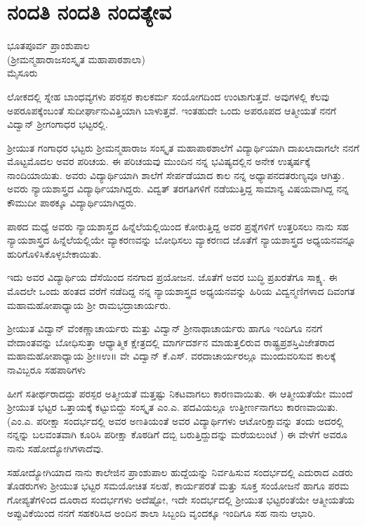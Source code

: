 {\fontsize{14}{16}\selectfont
\chapter{ನಂದತಿ ನಂದತಿ ನಂದತ್ಯೇವ}                           

\begin{center}
\smallskip

ಭೂತಪೂರ್ವ ಪ್ರಾಂಶುಪಾಲ\\
(ಶ್ರೀಮನ್ಮಹಾರಾಜಸಂಸ್ಕೃತ  ಮಹಾಪಾಠಶಾಲಾ)\\
ಮೈಸೂರು
\addrule
\end{center}
ಲೋಕದಲ್ಲಿ ಸ್ನೇಹ ಬಾಂಧವ್ಯಗಳು ಪರಸ್ಪರ ಕಾಲಕರ್ಮ ಸಂಯೋಗದಿಂದ ಉಂಟಾಗುತ್ತವೆ. ಅವುಗಳಲ್ಲಿ ಕೆಲವು ಅಪರೂಪಕ್ಕೆಂಬಂತೆ ಸುದೀರ್ಘಾನುವಿತ್ತಿಯಾಗಿ ಬಾಳುತ್ತವೆ. ಇಂತಹುದೇ ಒಂದು ಅಪರೂಪದ ಆತ್ಮೀಯತೆ ನನಗೆ ವಿದ್ವಾನ್ ಶ್ರೀಗಂಗಾಧರ ಭಟ್ಟರಲ್ಲಿ. 

ಶ್ರೀಯುತ ಗಂಗಾಧರ ಭಟ್ಟರು ಶ್ರೀಮನ್ಮಹಾರಾಜ ಸಂಸ್ಕೃತ ಮಹಾಪಾಠ\-ಶಾಲೆಗೆ ವಿದ್ಯಾರ್ಥಿಯಾಗಿ ದಾಖಲಾದಾಗಲೇ ನನಗೆ ಮೊಟ್ಟಮೊದಲ ಅವರ ಪರಿಚಯ. ಈ ಪರಿಚಯವು ಮುಂದಿನ ನನ್ನ ಭವಿಷ್ಯದಲ್ಲಿನ ಅನೇಕ ಉತ್ಕರ್ಷಕ್ಕೆ ನಾಂದಿಯಾಯಿತು.  ಅವರು ವಿದ್ಯಾರ್ಥಿಯಾಗಿ ಶಾಲೆಗೆ ಸೇರ್ಪಡೆಯಾದ ಕಾಲ ನನ್ನ ಅಧ್ಯಾಪನದ\break ತರುಣ್ಯವೂ ಆಗಿತ್ತು. ಅವರು ನ್ಯಾಯಶಾಸ್ತ್ರದ ವಿದ್ಯಾರ್ಥಿಯಾಗಿದ್ದರು. ವಿದ್ವತ್ ತರಗತಿಗಳಿಗೆ ನಡೆಯುತ್ತಿದ್ದ ಸಾಮಾನ್ಯ ವಿಷಯವಾಗಿದ್ದ ನನ್ನ ಕೌಮುದೀ ಪಾಠಕ್ಕೂ ವಿದ್ಯಾರ್ಥಿಯಾಗಿದ್ದರು.

ಪಾಠದ ಮಧ್ಯೆ ಅವರು ನ್ಯಾಯಶಾಸ್ತ್ರದ ಹಿನ್ನೆಲೆಯಲ್ಲಿಯಿಂದ ಕೋರುತ್ತಿದ್ದ ಅವರ ಪ್ರಶ್ನೆಗಳಿಗೆ ಉತ್ತರಿಸಲು ನಾನು ಸಹ ನ್ಯಾಯಶಾಸ್ತ್ರದ ಹಿನ್ನೆಲೆಯಲ್ಲಿಯೇ ವ್ಯಾಕರಣವನ್ನು ಬೋಧಿಸಲು ವ್ಯಾಕರಣದ ಜೊತೆಗೆ ನ್ಯಾಯಶಾಸ್ತ್ರದ ಅಧ್ಯಯನವನ್ನೂ ಹುರಿ\-ಗೊಳಿಸಿಕೊಳ್ಳಬೇಕಾಯಿತು. 

ಇದು ಅವರ ವಿದ್ಯಾರ್ಥಿಯ ದೆಸೆಯಿಂದ ನನಗಾದ ಪ್ರಯೋಜನ. ಜೊತೆಗೆ ಅವರ ಬುದ್ಧಿ ಪ್ರಖರತೆಗೂ ಸಾಕ್ಷ್ಯ. ಈ ಮೊದಲೇ ಒಂದು ಹಂತದ ವರೆಗೆ ನಡೆದಿದ್ದ ನನ್ನ ನ್ಯಾಯಶಾಸ್ತ್ರದ ಅಧ್ಯಯನವನ್ನು ಹಿರಿಯ ವಿದ್ವನ್ಮಣಿಗಳಾದ ದಿವಂಗತ ಮಹಾಮಹೋಪಾಧ್ಯಾಯ ಶ್ರೀ ರಾಮಭದ್ರಾಚಾರ್ಯರು.

ಶ್ರೀಯುತ ವಿದ್ವಾನ್ ವೆಂಕಣ್ಣಾಚಾರ್ಯರು ಮತ್ತು ವಿದ್ವಾನ್ ಶ್ರೀನಾಥಾ\-\break ಚಾರ್ಯರು ಹಾಗೂ ಇಂದಿಗೂ ನನಗೆ ವೇದಾಂತವನ್ನು ಬೋಧಿಸುತ್ತಾ ಆಧ್ಯಾತ್ಮಿಕ ಕ್ಷೇತ್ರದಲ್ಲಿ ಮಾರ್ಗದರ್ಶನ ಮಾಡುತ್ತಲಿರುವ ರಾಷ್ಟ್ರಪ್ರಶಸ್ತಿವಿಜೇತರಾದ ಮಹಾಮಹೋಪಾಧ್ಯಾಯ ಶ್ರೀ॥ಉ॥ ವೇ ವಿದ್ವಾನ್ ಕೆ.ಎಸ್. ವರದಾಚಾರ್ಯರಲ್ಲೂ ಮುಂದುವರಿಸುವ ಕಾಲಕ್ಕೆ ನಾವಿಬ್ಬರೂ ಸಹಪಾಠಿಗಳು

ಹೀಗೆ ಸತೀರ್ಥರಾದದ್ದು ಪರಸ್ಪರ ಅತ್ಮೀಯತೆ ಮತ್ತಷ್ಟು ನಿಕಟವಾಗಲು ಕಾರಣ\-ವಾಯಿತು. ಈ ಆತ್ಮೀಯತೆಯೇ ಮುಂದೆ ಶ್ರೀಯುತ ಭಟ್ಟರ ಒತ್ತಾಯಕ್ಕೆ ಕಟ್ಟುಬಿದ್ದು ಸಂಸ್ಕೃತ ಎಂ.ಎ. ಪದವಿಯಲ್ಲೂ ಉತ್ತೀರ್ಣನಾಗಲು ಕಾರಣವಾಯಿತು. (ಎಂ.ಎ. ಪರೀಕ್ಷಾ ಸಂದರ್ಭದಲ್ಲಿ ಅವರ ಅಣತಿಯಂತೆ ಅವರ ವಿದ್ಯಾರ್ಥಿಗಳು ಆಟೋರಿಕ್ಷಾವನ್ನು ತಂದು ಅದರಲ್ಲಿ ನನ್ನನ್ನು ಬಲವಂತವಾಗಿ ಕೂರಿಸಿ ಪರೀಕ್ಷಾ ಕೊಠಡಿಗೆ ದಬ್ಬಿ ಬರುತ್ತಿದ್ದುದನ್ನು ಮರೆಯಲುಂಟೆ ) ಈ ವೇಳೆಗೆ ಅವರೂ ನಾನು ಸಹೋದ್ಯೋಗಿಗಳಾದೆವು. 

ಸಹೋದ್ಯೋಗಿಯಾದ ನಾನು ಕಾಲೇಜಿನ ಪ್ರಾಂಶುಪಾಲ ಹುದ್ದೆಯನ್ನು ನಿರ್ವಹಿಸುವ ಸಂದರ್ಭದಲ್ಲಿ ಎದುರಾದ ಎಡರು ತೊಡರುಗಳು ಶ್ರೀಯುತ ಭಟ್ಟರ ಸಮಯೋಚಿತ ಸಲಹೆ, ಕಾರ್ಯಪರತೆ ಮತ್ತು ಸೂಕ್ತ ಸಂಯೋಜನೆ ಹಾಗೂ ಪರಮ ಗೋಪ್ಯತೆಗಳಿಂದ ದೂರಾದ ಸಂದರ್ಭಗಳು ಅದೆಷ್ಟೋ, ಇದೇ ಸಂದರ್ಭದಲ್ಲಿ ಶ್ರೀಯುತ ಭಟ್ಟರಂತೆಯೇ ಆತ್ಮೀಯತೆಯ ಅಪ್ಪುವಿಕೆಯಿಂದ ನನಗೆ ಸಹಕರಿಸಿದ ಅಂದಿನ ಶಾಲಾ ಸಿಬ್ಬಂದಿ ವೃಂದಕ್ಕೂ ಇಂದಿಗೂ ಸಹ ನಾನು ಆಭಾರಿ. 

}
